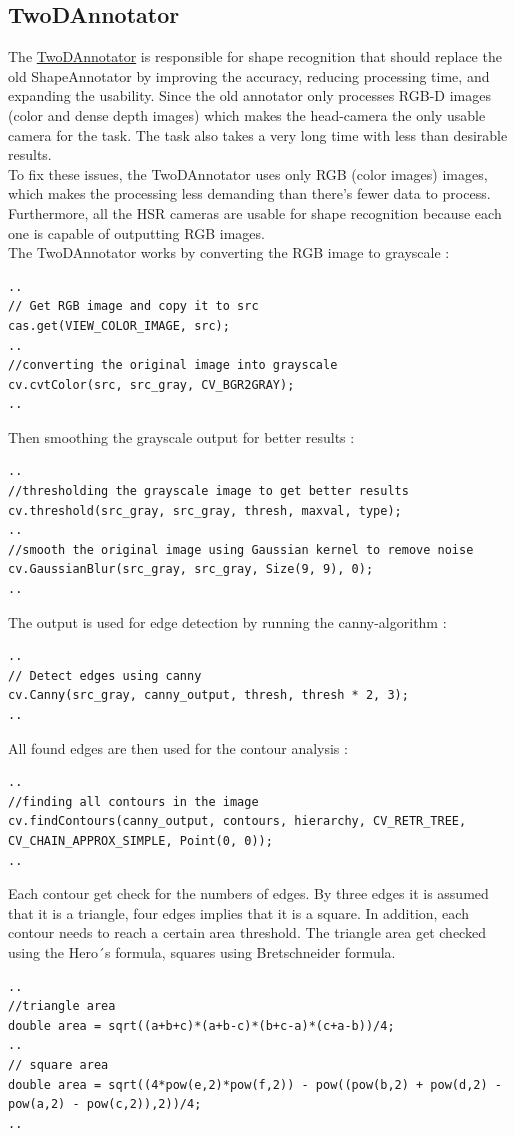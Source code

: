 \documentclass[main.tex]{subfiles}
\begin{document}
				\subsection{TwoDAnnotator}
The \href{https://github.com/SUTURO/suturo_perception/blob/Handcamera_tracking/rs_Athene/src/TwoDAnnotator.cpp}{TwoDAnnotator} is responsible for shape recognition that should replace the old ShapeAnnotator by improving the accuracy, reducing processing time, and expanding the usability. 
Since the old annotator only processes RGB-D images (color and dense depth images) which makes the head-camera the only usable camera for the task. The task also takes a very long time with less than desirable results. \\
To fix these issues, the TwoDAnnotator uses only RGB (color images) images, which makes the processing less demanding than there's fewer data to process. Furthermore, all the HSR cameras are usable for shape recognition because each one is capable of outputting RGB images. \\
The TwoDAnnotator works by converting the RGB image to grayscale :
\begin{lstlisting}
..
// Get RGB image and copy it to src
cas.get(VIEW_COLOR_IMAGE, src); 
..
//converting the original image into grayscale
cv.cvtColor(src, src_gray, CV_BGR2GRAY);
..
\end{lstlisting}
Then smoothing the grayscale output for better results : 
\begin{lstlisting}
..
//thresholding the grayscale image to get better results
cv.threshold(src_gray, src_gray, thresh, maxval, type);
..
//smooth the original image using Gaussian kernel to remove noise
cv.GaussianBlur(src_gray, src_gray, Size(9, 9), 0);
..
\end{lstlisting}
The output is used for edge detection by running the canny-algorithm : 
\begin{lstlisting}
..
// Detect edges using canny
cv.Canny(src_gray, canny_output, thresh, thresh * 2, 3);
..
\end{lstlisting}
All found edges are then used for the contour analysis : 
\begin{lstlisting}
..
//finding all contours in the image
cv.findContours(canny_output, contours, hierarchy, CV_RETR_TREE, CV_CHAIN_APPROX_SIMPLE, Point(0, 0));
..
\end{lstlisting}
Each contour get check for the numbers of edges. By three edges it is assumed that it is a triangle, four edges implies that it is a square. In addition, each contour needs to reach a certain area threshold. The triangle area get checked using the Hero´s formula, squares using Bretschneider formula. \\
\begin{lstlisting}
..
//triangle area
double area = sqrt((a+b+c)*(a+b-c)*(b+c-a)*(c+a-b))/4;
..
// square area
double area = sqrt((4*pow(e,2)*pow(f,2)) - pow((pow(b,2) + pow(d,2) - pow(a,2) - pow(c,2)),2))/4;
..
\end{lstlisting}
\end{document}
